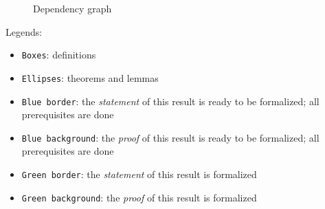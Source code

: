 \begin{figure}[H]
\begin{minipage}[b]{0.6\textwidth}
{\begin{dot2tex}[dot,options=--cache]
    \end{dot2tex}
    }
    \caption{Dependency graph}
    \label{fig:dep_graph}
    \medskip
    \end{minipage}%
    \end{figure}

Legends:

\begin{itemize}
    \item \texttt{Boxes}: definitions
    \item \texttt{Ellipses}: theorems and lemmas
    \item \texttt{Blue border}: the \emph{statement} of this result is ready to be formalized; all prerequisites are done
    \item \texttt{Blue background}: the \emph{proof} of this result is ready to be formalized; all prerequisites are done
    \item \texttt{Green border}:  the \emph{statement} of this result is formalized
    \item \texttt{Green background}: the \emph{proof} of this result is formalized
\end{itemize}